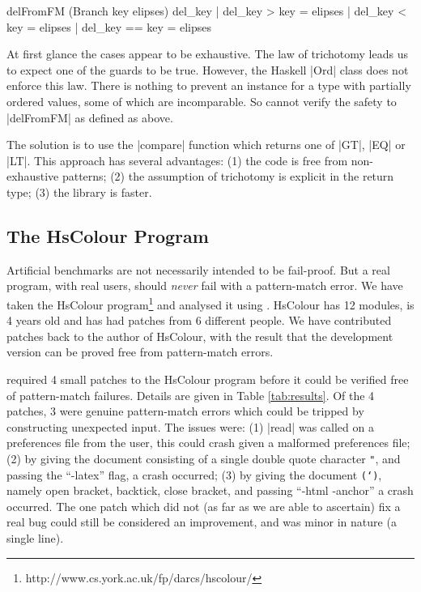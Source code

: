 \begin{code}
delFromFM (Branch key elipses) del_key  | del_key  >   key = elipses
                                        | del_key  <   key = elipses
                                        | del_key  ==  key = elipses
\end{code}

At first glance the cases appear to be exhaustive. The law of trichotomy leads us to expect one of the guards to be true. However, the Haskell |Ord| class does not enforce this law. There is nothing to prevent an instance for a type with partially ordered values, some of which are incomparable. So \catch{} cannot verify the safety to |delFromFM| as defined as above.

The solution is to use the |compare| function which returns one of |GT|, |EQ| or |LT|. This approach has several advantages: (1) the code is free from non-exhaustive patterns; (2) the assumption of trichotomy is explicit in the return type; (3) the library is faster.


\subsection{The HsColour Program}
\label{sec:hscolour}

Artificial benchmarks are not necessarily intended to be fail-proof. But a real program, with real users, should \textit{never} fail with a pattern-match error. We have taken the HsColour program\footnote{http://www.cs.york.ac.uk/fp/darcs/hscolour/} and analysed it using \catch{}. HsColour has 12 modules, is 4 years old and has had patches from 6 different people.
We have contributed patches back to the author of HsColour, with the result that the development version can be proved free from pattern-match errors.

\catch{} required 4 small patches to the HsColour program before it could be verified free of pattern-match failures. Details are given in Table \ref{tab:results}. Of the 4 patches, 3 were genuine pattern-match errors which could be tripped by constructing unexpected input. The issues were: (1) |read| was called on a preferences file from the user, this could crash given a malformed preferences file; (2) by giving the document consisting of a single double quote character \texttt{"}, and passing the ``-latex'' flag, a crash occurred; (3) by giving the document \texttt{(`)}, namely open bracket, backtick, close bracket, and passing ``-html -anchor'' a crash occurred. The one patch which did not (as far as we are able to ascertain) fix a real bug could still be considered an improvement, and was minor in nature (a single line).

